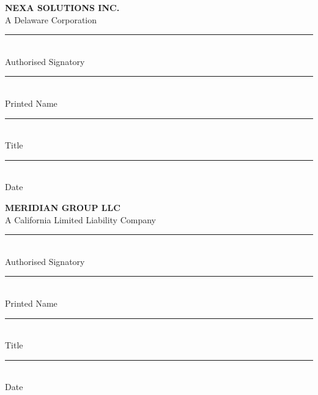 \documentclass[11pt,a4paper]{article}
\newcommand{\signline}[1]{%
  \vspace{16pt}%
  \noindent\rule{6.5cm}{0.5pt}\\{}%
  {\sffamily\footnotesize\color{MidGray}#1}%
}
\begin{document}
\vspace{6mm}

\noindent
\begin{minipage}[t]{0.46\linewidth}
  \begin{tcolorbox}[signaturebox]
    \sffamily\small
    {\color{SlateBlue}\bfseries NEXA SOLUTIONS INC.}\\[2pt]
    {\color{MidGray}\footnotesize A Delaware Corporation}

    \signline{Authorised Signatory}

    \vspace{10pt}
    \noindent\rule{6.5cm}{0.5pt}\\{}%
    {\sffamily\footnotesize\color{MidGray}Printed Name}

    \vspace{10pt}
    \noindent\rule{6.5cm}{0.5pt}\\{}%
    {\sffamily\footnotesize\color{MidGray}Title}

    \vspace{10pt}
    \noindent\rule{6.5cm}{0.5pt}\\{}%
    {\sffamily\footnotesize\color{MidGray}Date}
  \end{tcolorbox}
\end{minipage}%
\hfill
\begin{minipage}[t]{0.46\linewidth}
  \begin{tcolorbox}[signaturebox]
    \sffamily\small
    {\color{SlateBlue}\bfseries MERIDIAN GROUP LLC}\\[2pt]
    {\color{MidGray}\footnotesize A California Limited Liability Company}

    \signline{Authorised Signatory}

    \vspace{10pt}
    \noindent\rule{6.5cm}{0.5pt}\\{}%
    {\sffamily\footnotesize\color{MidGray}Printed Name}

    \vspace{10pt}
    \noindent\rule{6.5cm}{0.5pt}\\{}%
    {\sffamily\footnotesize\color{MidGray}Title}

    \vspace{10pt}
    \noindent\rule{6.5cm}{0.5pt}\\{}%
    {\sffamily\footnotesize\color{MidGray}Date}
  \end{tcolorbox}
\end{minipage}

\vspace{8mm}
\end{document}
